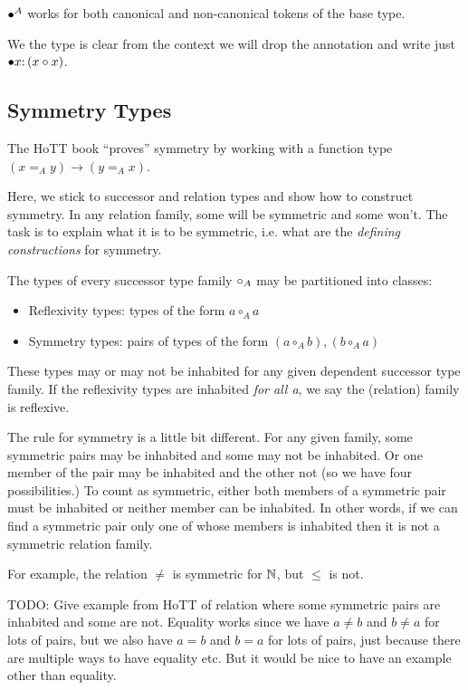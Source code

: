 \documentclass{article}
\begin{document}
\(\bullet^A\) works for both canonical and non-canonical tokens of the base type.

We the type is clear from the context we will drop the annotation and
write just \(\bullet x{:}\,(x\circ x)\).

\subsection{Symmetry Types}

The HoTT book ``proves'' symmetry by working with a function type
\((x=_Ay)\to (y=_Ax)\).

Here, we stick to successor and relation types and show how to
construct symmetry.  In any relation family, some will be symmetric
and some won't.  The task is to explain what it is to be symmetric,
i.e. what are the \emph{defining constructions} for symmetry.

The types of every successor type family \(\circ_A\) may be partitioned
into classes:

\begin{itemize}
\item Reflexivity types: types of the form \(a\circ_A a\)
\item Symmetry types: pairs of types of the form \((a\circ_A b), (b\circ_A a)\)
\end{itemize}

These types may or may not be inhabited for any given dependent
successor type family.  If the reflexivity types are inhabited
\emph{for all a}, we say the (relation) family is reflexive.

The rule for symmetry is a little bit different.  For any given
family, some symmetric pairs may be inhabited and some may not be
inhabited.  Or one member of the pair may be inhabited and the
other not (so we have four possibilities.)  To count as symmetric,
either both members of a symmetric pair must be inhabited or neither
member can be inhabited.  In other words, if we can find a symmetric
pair only one of whose members is inhabited then it is not a symmetric
relation family.

For example, the relation \(\neq\) is symmetric for \(\mathbb{N}\), but
\(\leq\) is not.

\begin{remark}
  TODO: Give example from HoTT of relation where some symmetric pairs
  are inhabited and some are not.  Equality works since we have
  \(a\neq b\) and \(b\neq a\) for lots of pairs, but we also have \(a=
  b\) and \(b=a\) for lots of pairs, just because there are multiple
  ways to have equality etc. But it would be nice to have an example
  other than equality.
\end{remark}
\end{document}
